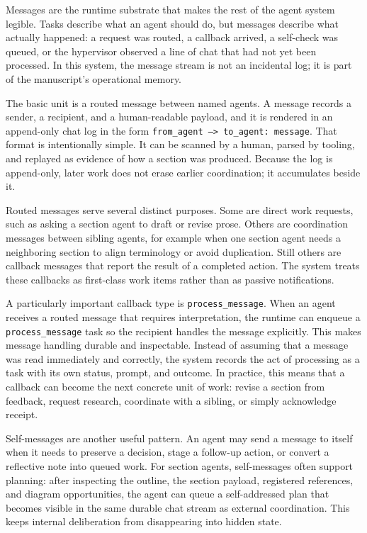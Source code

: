 Messages are the runtime substrate that makes the rest of the agent system legible. Tasks describe what an agent should do, but messages describe what actually happened: a request was routed, a callback arrived, a self-check was queued, or the hypervisor observed a line of chat that had not yet been processed. In this system, the message stream is not an incidental log; it is part of the manuscript's operational memory.

The basic unit is a routed message between named agents. A message records a sender, a recipient, and a human-readable payload, and it is rendered in an append-only chat log in the form \texttt{from\_agent --\textgreater{} to\_agent: message}. That format is intentionally simple. It can be scanned by a human, parsed by tooling, and replayed as evidence of how a section was produced. Because the log is append-only, later work does not erase earlier coordination; it accumulates beside it.

Routed messages serve several distinct purposes. Some are direct work requests, such as asking a section agent to draft or revise prose. Others are coordination messages between sibling agents, for example when one section agent needs a neighboring section to align terminology or avoid duplication. Still others are callback messages that report the result of a completed action. The system treats these callbacks as first-class work items rather than as passive notifications.

A particularly important callback type is \texttt{process\_message}. When an agent receives a routed message that requires interpretation, the runtime can enqueue a \texttt{process\_message} task so the recipient handles the message explicitly. This makes message handling durable and inspectable. Instead of assuming that a message was read immediately and correctly, the system records the act of processing as a task with its own status, prompt, and outcome. In practice, this means that a callback can become the next concrete unit of work: revise a section from feedback, request research, coordinate with a sibling, or simply acknowledge receipt.

Self-messages are another useful pattern. An agent may send a message to itself when it needs to preserve a decision, stage a follow-up action, or convert a reflective note into queued work. For section agents, self-messages often support planning: after inspecting the outline, the section payload, registered references, and diagram opportunities, the agent can queue a self-addressed plan that becomes visible in the same durable chat stream as external coordination. This keeps internal deliberation from disappearing into hidden state.

